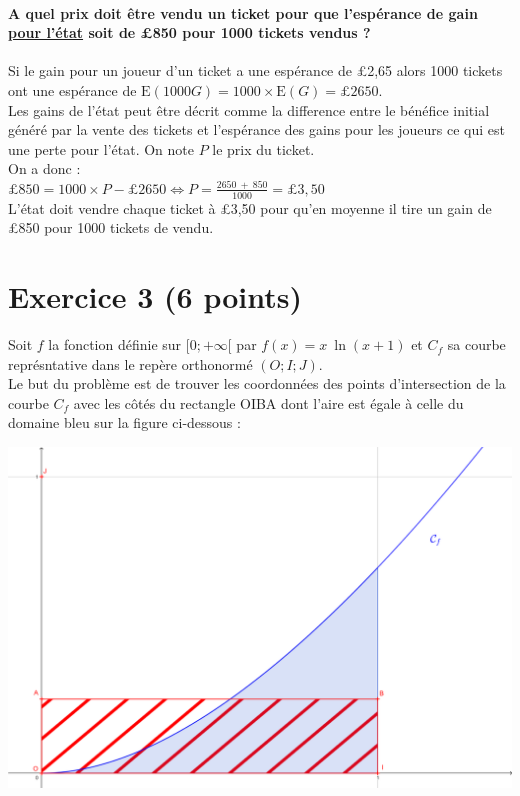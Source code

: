 \documentclass[a4paper, 12pt]{article}
\begin{document}
\paragraph*{A quel prix doit être vendu un ticket pour que l'espérance de gain \underline{pour l'état} soit de £850 pour 1000 tickets vendus ?\\[5mm]}

Si le gain pour un joueur d'un ticket a une espérance de £2,65 alors 1000 tickets ont une espérance de $\text{E}(1000G) = 1000\times \text{E}(G) = \pounds 2650$. 
\\
Les gains de l'état peut être décrit comme la difference entre le bénéfice initial généré par la vente des tickets et l'espérance des gains pour les joueurs ce qui est une perte pour l'état.
On note $P$ le prix du ticket. \\
On a donc : \\[2mm]
$\pounds 850 = 1000 \times P - \pounds 2650 \iff P = \frac{2650\ +\ 850}{1000} = \pounds 3,50$ \\[2mm]
L'état doit vendre chaque ticket à £3,50 pour qu'en moyenne il tire un gain de £850 pour 1000 tickets de vendu.
\vspace{1cm}

{}
\section*{Exercice 3 (6 points)}

Soit $f$ la fonction définie sur $[0;+\infty[$ par $f(x) = x\ \ln \left(x + 1 \right)$ et $C_f$ sa courbe représntative dans le repère orthonormé $(O;I;J)$.
\\
Le but du problème est de trouver les coordonnées des points d'intersection de la courbe $C_f$ avec les côtés du rectangle OIBA dont l'aire est égale à celle du domaine bleu sur la figure ci-dessous :
\\
\begin{center}
\includegraphics[width=400pt]{ControleCommunMathsGrapheExercice3}
\end{center}
\end{document}
